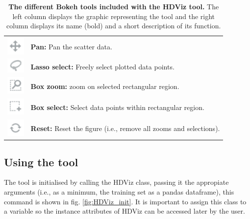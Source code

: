 \documentclass[11pt]{article} %
\begin{document}
\begin{table}[!h]
\centering
\begin{tabular}{
    >{\centering\arraybackslash}m{1cm}%
    |>{\centering\arraybackslash}m{12cm}
    }

\includegraphics[width=0.35in]{images/bokeh_tools_move} & \textbf{Pan:} Pan the scatter data.  \\
\includegraphics[width=0.35in]{images/bokeh_tools_lassoo} & \textbf{Lasso select:} Freely select plotted data points.\\ 
\includegraphics[width=0.35in]{images/bokeh_tools_boxzoom} & \textbf{Box zoom:} zoom on selected rectangular region.   \\
\includegraphics[width=0.35in]{images/bokeh_tools_boxselect} & \textbf{Box select:} Select data points within rectangular region. \\ 
\includegraphics[width=0.35in]{images/bokeh_tools_reset} & \textbf{Reset:} Reset the figure (i.e., remove all zooms and selections).\\ 
\end{tabular}
\caption{\textbf{The different Bokeh tools included with the HDViz tool.} The left column displays the graphic representing the tool and the right column displays its name (bold) and a short description of its function.}
\label{tab:bokeh_tools}
\end{table}

\subsection{Using the tool}

The tool is initialised by calling the HDViz class, passing it the appropiate arguments (i.e., as a minimum, the training set as a pandas dataframe), this command is shown in fig. \ref{fig:HDViz_init}. It is important to assign this class to a variable so the instance attributes of HDViz can be accessed later by the user.
\end{document}
